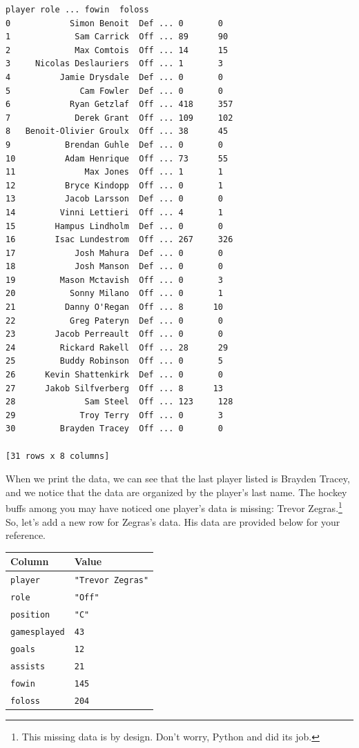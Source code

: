 \begin{lstlisting}[style=none]
                   player role ... fowin  foloss
0            Simon Benoit  Def ... 0       0
1             Sam Carrick  Off ... 89      90
2             Max Comtois  Off ... 14      15
3     Nicolas Deslauriers  Off ... 1       3
4          Jamie Drysdale  Def ... 0       0
5              Cam Fowler  Def ... 0       0
6            Ryan Getzlaf  Off ... 418     357
7             Derek Grant  Off ... 109     102
8   Benoit-Olivier Groulx  Off ... 38      45
9           Brendan Guhle  Def ... 0       0
10          Adam Henrique  Off ... 73      55
11              Max Jones  Off ... 1       1
12          Bryce Kindopp  Off ... 0       1
13          Jacob Larsson  Def ... 0       0
14         Vinni Lettieri  Off ... 4       1
15        Hampus Lindholm  Def ... 0       0
16        Isac Lundestrom  Off ... 267     326
17            Josh Mahura  Def ... 0       0
18            Josh Manson  Def ... 0       0
19         Mason Mctavish  Off ... 0       3
20           Sonny Milano  Off ... 0       1
21          Danny O'Regan  Off ... 8      10
22           Greg Pateryn  Def ... 0       0
23        Jacob Perreault  Off ... 0       0
24         Rickard Rakell  Off ... 28      29
25         Buddy Robinson  Off ... 0       5
26      Kevin Shattenkirk  Def ... 0       0
27      Jakob Silfverberg  Off ... 8      13
28              Sam Steel  Off ... 123     128
29             Troy Terry  Off ... 0       3
30         Brayden Tracey  Off ... 0       0

[31 rows x 8 columns]
\end{lstlisting}
When we print the data, we can see that the last player listed is Brayden Tracey, and we notice that the data are organized by the player's last name. The hockey buffs among you may have noticed one player's data is missing: Trevor Zegras.\footnote{This missing data is by design. Don't worry, Python and  did its job.} So, let's add a new row for Zegras's data. His data are provided below for your reference.\par
\vspace{5mm}
\begin{tabular}{|l|l|}
\hline
Column             & Value                  \\
\hline
\verb|player|      & \verb|"Trevor Zegras"| \\
\hline
\verb|role|        & \verb|"Off"|           \\
\hline
\verb|position|    & \verb|"C"|             \\
\hline
\verb|gamesplayed| & \verb|43|              \\
\hline
\verb|goals|       & \verb|12|              \\
\hline
\verb|assists|     & \verb|21|              \\
\hline
\verb|fowin|       & \verb|145|             \\
\hline
\verb|foloss|      & \verb|204|            \\
\hline
\end{tabular}\par
